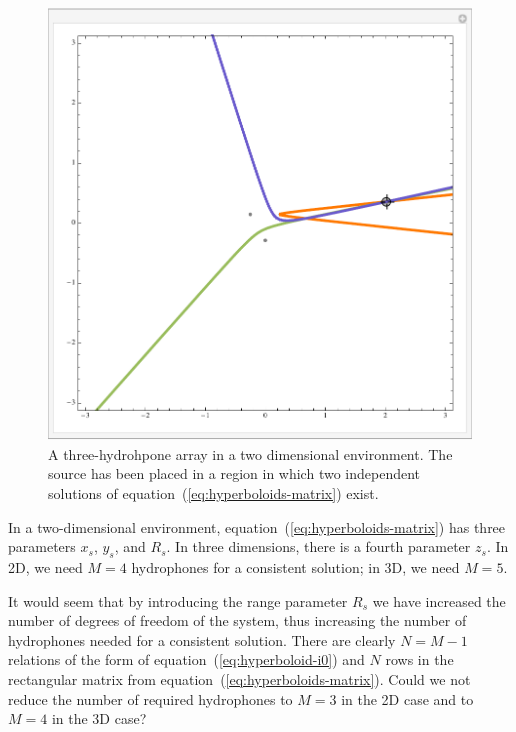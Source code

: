 \documentclass[10pt]{article}
\begin{document}
\begin{figure}[htbp]
\begin{center}
\includegraphics[scale=0.5]{hyperbola-bad.pdf}
\caption{A three-hydrohpone array in a two dimensional environment.  The source has been placed in a region in which two independent solutions of equation~(\ref{eq:hyperboloids-matrix}) exist.}
\label{fig:hyperbola-bad}
\end{center}
\end{figure}

In a two-dimensional environment, equation~(\ref{eq:hyperboloids-matrix})  has three parameters \(x_s\), \(y_s\), and \(R_s\).  In three dimensions, there is a fourth parameter \(z_s\).  In 2D, we need \(M=4\) hydrophones for a consistent solution; in 3D, we need \(M=5\).

It would seem that by introducing the range parameter \(R_s\) we have increased the number of degrees of freedom of the system, thus increasing the number of hydrophones needed for a consistent solution.  There are clearly \(N=M-1\) relations of the form of equation~(\ref{eq:hyperboloid-i0}) and \(N\) rows in the rectangular matrix from equation~(\ref{eq:hyperboloids-matrix}).  Could we not reduce the number of required hydrophones to \(M=3\) in the 2D case and to \(M=4\) in the 3D case?
\end{document}
